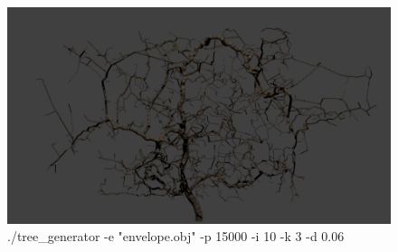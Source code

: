 \documentclass[10pt,a4paper]{report}
\begin{document}
\begin{figure}
\includegraphics[scale=0.47]{figura8.png}
\caption{./tree\_generator -e "envelope.obj" -p 15000 -i 10 -k 3 -d 0.06}
\end{figure}
\end{document}
